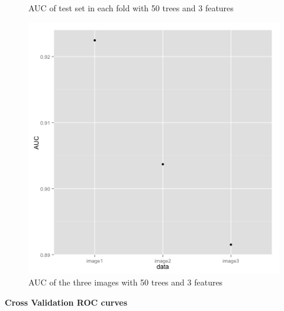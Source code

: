 \documentclass{article}\usepackage[]{graphicx}\usepackage[]{color}
\begin{document}
\begin{figure}[h]
  \caption{AUC of test set in each fold with 50 trees and 3 features}\label{}
\endminipage\hfill
{}%
  \includegraphics[width=\linewidth]{imageAUC.png}
  \caption{AUC of the three images with 50 trees and 3 features}\label{}
\endminipage
\end{figure}


{\bf Cross Validation ROC curves}
\end{document}
